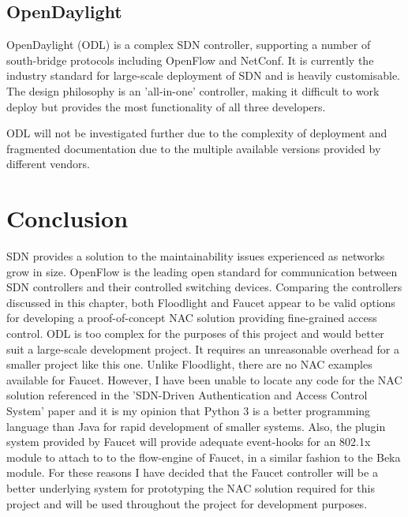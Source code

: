 \subsection{OpenDaylight}
OpenDaylight (ODL) is a complex SDN controller, supporting a number of south-bridge protocols including OpenFlow and NetConf. It is currently the industry standard for large-scale deployment of SDN and is heavily customisable. The design philosophy is an 'all-in-one' controller, making it difficult to work deploy but provides the most functionality of all three developers.

ODL will not be investigated further due to the complexity of deployment and fragmented documentation due to the multiple available versions provided by different vendors.

\section{Conclusion}
SDN provides a solution to the maintainability issues experienced as networks grow in size. OpenFlow is the leading open standard for communication between SDN controllers and their controlled switching devices. 
Comparing the controllers discussed in this chapter, both Floodlight and Faucet appear to be valid options for developing a proof-of-concept NAC solution providing fine-grained access control. ODL is too complex for the purposes of this project and would better suit a large-scale development project. It requires an unreasonable overhead for a smaller project like this one.
Unlike Floodlight, there are no NAC examples available for Faucet. However, I have been unable to locate any code for the NAC solution referenced in the 'SDN-Driven Authentication and Access Control System'\cite{vainius_sdn_nac} paper and it is my opinion that Python 3 is a better programming language than Java for rapid development of smaller systems. Also, the plugin system provided by Faucet will provide adequate event-hooks for an 802.1x module to attach to to the flow-engine of Faucet, in a similar fashion to the Beka module. 
For these reasons I have decided that the Faucet controller will be a better underlying system for prototyping the NAC solution required for this project and will be used throughout the project for development purposes.